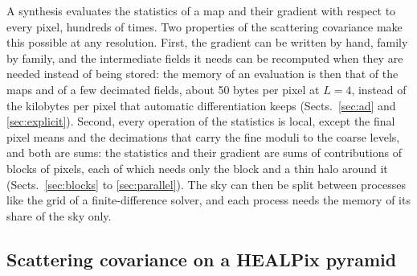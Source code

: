 \documentclass{aa}
\begin{document}
A synthesis evaluates the statistics of a map and their gradient with respect to every pixel, hundreds of times. Two properties of the scattering covariance make this possible at any resolution. First, the gradient can be written by hand, family by family, and the intermediate fields it needs can be recomputed when they are needed instead of being stored: the memory of an evaluation is then that of the maps and of a few decimated fields, about 50 bytes per pixel at $L=4$, instead of the kilobytes per pixel that automatic differentiation keeps (Sects.~\ref{sec:ad} and \ref{sec:explicit}). Second, every operation of the statistics is local, except the final pixel means and the decimations that carry the fine moduli to the coarse levels, and both are sums: the statistics and their gradient are sums of contributions of blocks of pixels, each of which needs only the block and a thin halo around it (Sects.~\ref{sec:blocks} to \ref{sec:parallel}). The sky can then be split between processes like the grid of a finite-difference solver, and each process needs the memory of its share of the sky only.

\subsection{Scattering covariance on a HEALPix pyramid}
\label{sec:stats}
\end{document}
